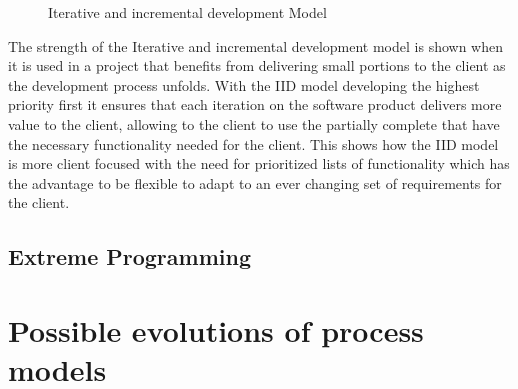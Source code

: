 \documentclass{style/CRPITStyle}
\begin{document}
\vspace{.1in}

\begin{figure}[htb]
\caption{\protect\label{iid} Iterative and incremental development Model}
\end{figure}

\vspace{.1in}

The strength of the Iterative and incremental development model is shown when it
is used in a project that benefits from delivering small portions to the client
as the development process unfolds. With the IID model developing the highest
priority first it ensures that each iteration on the software product delivers
more value to the client, allowing to the client to use the partially complete
that have the necessary functionality needed for the client.
This shows how the IID model is more client focused with the need for
prioritized lists of functionality which has the advantage to be flexible to
adapt to an ever changing set of requirements for the client.


\subsection{Extreme Programming} %

\section{Possible evolutions of process models}




\end{document}
